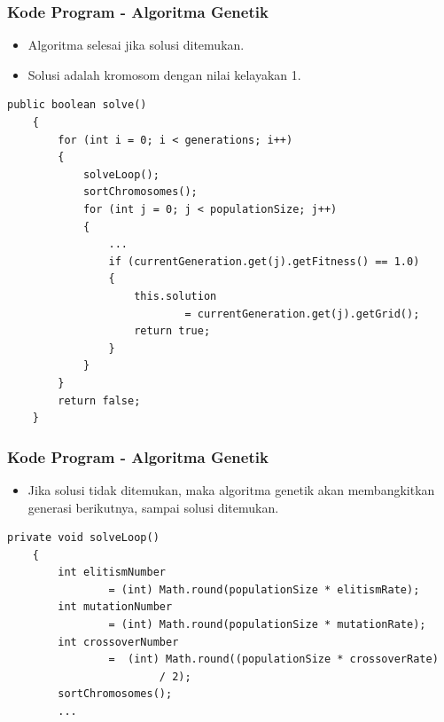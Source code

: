 \documentclass{beamer}
\begin{document}
\begin{frame}[fragile]
\frametitle{Kode Program - Algoritma Genetik}
\begin{itemize}
\item Algoritma selesai jika solusi ditemukan.
\item Solusi adalah kromosom dengan nilai kelayakan 1.
\end{itemize}
\begin{lstlisting}[basicstyle=\tiny]
    public boolean solve()
    {
        for (int i = 0; i < generations; i++)
        {
            solveLoop();
            sortChromosomes();
            for (int j = 0; j < populationSize; j++)
            {
                ...
                if (currentGeneration.get(j).getFitness() == 1.0)
                {
                    this.solution 
                            = currentGeneration.get(j).getGrid();
                    return true;
                }
            }
        }
        return false;
    }
\end{lstlisting}
\end{frame}


\begin{frame}[fragile]
\frametitle{Kode Program - Algoritma Genetik}
\begin{itemize}
\item Jika solusi tidak ditemukan, maka algoritma genetik akan membangkitkan generasi berikutnya, sampai solusi ditemukan.
\end{itemize}
\begin{lstlisting}[basicstyle=\tiny]
    private void solveLoop()
    {      
        int elitismNumber 
                = (int) Math.round(populationSize * elitismRate);
        int mutationNumber
                = (int) Math.round(populationSize * mutationRate);
        int crossoverNumber
                =  (int) Math.round((populationSize * crossoverRate)
                        / 2);
        sortChromosomes();
        ...
\end{lstlisting}
\end{frame}

\end{document}
